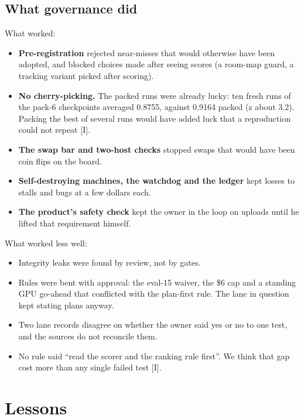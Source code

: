 \documentclass[11pt]{article}
\begin{document}
\subsection{What governance did}
What worked:

\begin{itemize}[itemsep=2pt,topsep=3pt]
\item \textbf{Pre-registration} rejected near-misses that would otherwise have been adopted, and blocked choices made after seeing scores (a room-map guard, a tracking variant picked after scoring).
\item \textbf{No cherry-picking.} The packed runs were already lucky: ten fresh runs of the pack-6 checkpoints averaged 0.8755, against 0.9164 packed (z about 3.2). Packing the best of several runs would have added luck that a reproduction could not repeat {[}I{]}.
\item \textbf{The swap bar and two-host checks} stopped swaps that would have been coin flips on the board.
\item \textbf{Self-destroying machines, the watchdog and the ledger} kept losses to stalls and bugs at a few dollars each.
\item \textbf{The product's safety check} kept the owner in the loop on uploads until he lifted that requirement himself.
\end{itemize}
What worked less well:

\begin{itemize}[itemsep=2pt,topsep=3pt]
\item Integrity leaks were found by review, not by gates.
\item Rules were bent with approval: the eval-15 waiver, the \$6 cap and a standing GPU go-ahead that conflicted with the plan-first rule. The lane in question kept stating plans anyway.
\item Two lane records disagree on whether the owner said yes or no to one test, and the sources do not reconcile them.
\item No rule said ``read the scorer and the ranking rule first''. We think that gap cost more than any single failed test {[}I{]}.
\end{itemize}
\section{Lessons}
\end{document}
